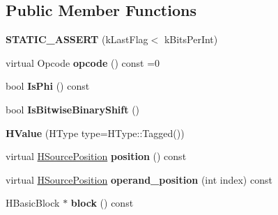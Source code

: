 \subsection*{Public Member Functions}
\begin{DoxyCompactItemize}
\item 
\hypertarget{classv8_1_1internal_1_1_h_value_ac99b86fe722461f3979d675a15ef38ff}{}{\bfseries S\+T\+A\+T\+I\+C\+\_\+\+A\+S\+S\+E\+R\+T} (k\+Last\+Flag$<$ k\+Bits\+Per\+Int)\label{classv8_1_1internal_1_1_h_value_ac99b86fe722461f3979d675a15ef38ff}

\item 
\hypertarget{classv8_1_1internal_1_1_h_value_a44fc746cceae7b32e506a686a77c0b2a}{}virtual Opcode {\bfseries opcode} () const =0\label{classv8_1_1internal_1_1_h_value_a44fc746cceae7b32e506a686a77c0b2a}

\item 
\hypertarget{classv8_1_1internal_1_1_h_value_ade74fdf3cc621f6d81d5d5005a4783f3}{}bool {\bfseries Is\+Phi} () const \label{classv8_1_1internal_1_1_h_value_ade74fdf3cc621f6d81d5d5005a4783f3}

\item 
\hypertarget{classv8_1_1internal_1_1_h_value_acb00fedefa4b7bbe2cdda3dbbed9b392}{}bool {\bfseries Is\+Bitwise\+Binary\+Shift} ()\label{classv8_1_1internal_1_1_h_value_acb00fedefa4b7bbe2cdda3dbbed9b392}

\item 
\hypertarget{classv8_1_1internal_1_1_h_value_a0e4f64e9d8d319e0211ca68b7692696f}{}{\bfseries H\+Value} (H\+Type type=H\+Type\+::\+Tagged())\label{classv8_1_1internal_1_1_h_value_a0e4f64e9d8d319e0211ca68b7692696f}

\item 
\hypertarget{classv8_1_1internal_1_1_h_value_a736cd9dd31c817bb608655776384453c}{}virtual \hyperlink{classv8_1_1internal_1_1_h_source_position}{H\+Source\+Position} {\bfseries position} () const \label{classv8_1_1internal_1_1_h_value_a736cd9dd31c817bb608655776384453c}

\item 
\hypertarget{classv8_1_1internal_1_1_h_value_a172ab3e5d95f6c8dce71ab39b603c487}{}virtual \hyperlink{classv8_1_1internal_1_1_h_source_position}{H\+Source\+Position} {\bfseries operand\+\_\+position} (int index) const \label{classv8_1_1internal_1_1_h_value_a172ab3e5d95f6c8dce71ab39b603c487}

\item 
\hypertarget{classv8_1_1internal_1_1_h_value_a201313d2353082a0c3ff8e84bfd921bf}{}H\+Basic\+Block $\ast$ {\bfseries block} () const \label{classv8_1_1internal_1_1_h_value_a201313d2353082a0c3ff8e84bfd921bf}


\end{DoxyCompactItemize}
